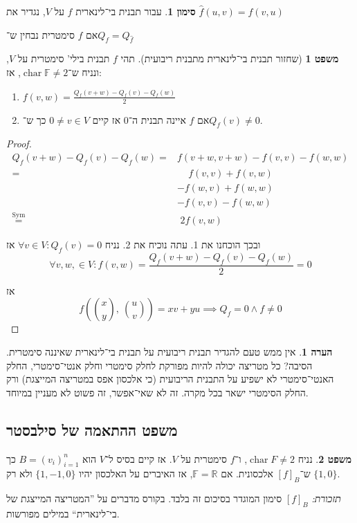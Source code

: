 \documentclass[a4paper]{article}
\newcommand\R     {\mathbb{R}}
\newcommand\h     {\hat}
\DeclareMathOperator{\chr}     {char}
\DeclareMathOperator{\sym}     {Sym}
\newcommand\F         {\mathbb{F}}
\newcommand\co        {\colon}
\theoremstyle{definition}
\newtheorem{Theorem}{\color{myblue}משפט}
\newtheorem{Remark}{\color{mycyan}הערה}
\newtheorem{Notion}{\color{myred}סימון}
\newcommand\theo  [1] {\begin{Theorem}#1\end{Theorem}}
\newcommand\rmark [1] {\begin{Remark}#1\end{Remark}}
\newcommand\noti  [1] {\begin{Notion}#1\end{Notion}}
\begin{document}
	\noti{עבור תבנית בי־לינארית $f$ על $V$, נגדיר את $\h f(u, v) = f(v, u)$}
	אם $f$ סימטרית נבחין ש־$Q_f = Q_{\h f}$
	
	\begin{Theorem}[שחזור תבנית בי־לינארית מתבנית ריבועית]
		תהי $f$ תבנית בילי' סימטרית על $V$, ונניח ש־$\chr \F \neq 2$, אז: 
		\begin{enumerate}
			\item \hfil $\displaystyle f(v, w) = \frac{Q_f(v + w) - Q_f(v) - Q_f(w)}{2}$
			\item אם $f$ איינה תבנית ה־$0$ אז קיים $0 \neq v \in V$ כך ש־$Q_f(v) \neq 0$. 
		\end{enumerate}
	\end{Theorem}
	\begin{proof}
		\begin{align*}
			Q_f(v + w) - Q_f(v) - Q_f(w) = &f(v + w, v + w) - f(v, v) - f(w, w) \\
			= &\quad\, f(v, v) + f(v, w) \\
			&-f(w, v) + f(w, w) \\
			&-f(v, v) - f(w, w) \\
			\overset{\sym}{=} \!\!&\,\, 2f(v, w)
		\end{align*}
		
		ובכך הוכחנו את 1. 
		עתה נוכיח את 2. נניח $\forall v \in V \co Q_f(v) = 0$ אז
		\[ \forall v, w, \in V \co f(v, w) = \frac{Q_f(v + w) - Q_f(v) - Q_f(w)}{2} = 0  \]
		
		אז
		\[ \textstyle f(\binom{x}{y}, \ \binom{u}{v}) = xv + yu \implies Q_f = 0 \land f \neq 0 \]
	\end{proof}
	
	\rmark{אין ממש טעם להגדיר תבנית ריבועית על תבנית בי־לינארית שאיננה סימטרית. הסיבה? כל מטריצה יכולה להיות מפורקת לחלק סימטרי וחלק אנטי־סימטרי, החלק האנטי־סימטרי לא ישפיע על התבנית הריבועית (כי אלכסון אפס במטריצה המייצגת) ורק החלק הסימטרי ישאר בכל מקרה. זה לא שאי־אפשר, זה פשוט לא מעניין במיוחד. }
	
	
	\subsection{משפט ההתאמה של סילבסטר}
	
	\theo{נניח $\chr F \neq 2$, ו־$f$ סימטרית על $V$. אז קיים בסיס ל־$V$ הוא $B = (v_i)_{i = 1}^{n}$ כך ש־$[f]_B$ אלכסונית. אם $\F = \R$, אז האיברים על האלכסון יהיו $\{1, -1, 0\}$ ולא רק $\{1, 0\}$. }
	
	\textit{תזכורת: }$[f]_B$ סימון המוגדר בסיכום זה בלבד. בקורס מדברים על ''המטריצה המייצגת של בי־לינארית`` במילים מפורשות. 
	
\end{document}
